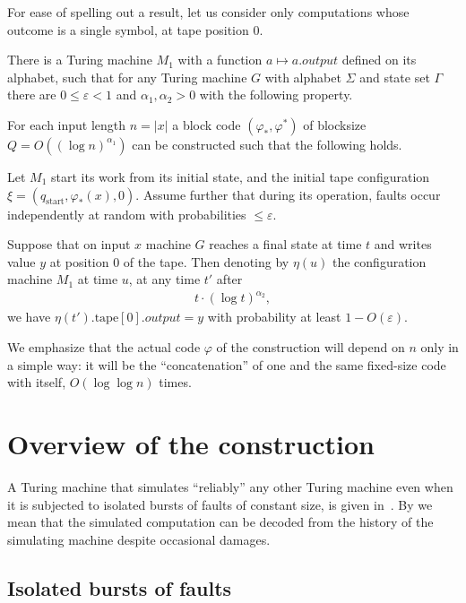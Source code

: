 \documentclass[12pt]{memoir}
\newcommand{\Output}{\mathit{output}}
\newcommand{\start}{\mathrm{start}}
\newcommand{\tape}{\mathrm{tape}}
\begin{document}
For ease of spelling out a result, let us consider only computations whose outcome
is a single symbol, at tape position 0.

\begin{theorem}\label{thm:main-main}
There is a Turing machine \( M_{1} \) with a 
function \( a\mapsto a.\Output \) defined on its alphabet, 
such that
for any Turing machine \( G \) with alphabet \( \Sigma \) and state set \( \Gamma \)
there are \( 0\le\varepsilon <1 \) and \( \alpha_{1},\alpha_{2}>0 \) 
with the following property.

For each input length \( n=|x| \) a block code
\( (\varphi_*, \varphi^*) \) of blocksize \( Q=O((\log n)^{\alpha_{1}}) \) can be constructed 
such that the following holds.

Let \( M_1 \) start its work from its initial state,
and the initial tape configuration \( \xi=(q_{\start},\varphi_{*}(x),0) \).
Assume further that
during its operation, faults occur independently at random
with probabilities \( \le \varepsilon \).

Suppose that on input \( x \) machine \( G \) reaches a final state at time \( t \) and writes
value \( y \) at position 0 of the tape.
Then denoting by \( \eta(u) \) the configuration machine \( M_{1} \) at time \( u \),
at any time \( t' \) after
 \begin{align*}
   t\cdot (\log t)^{\alpha_{2}},
 \end{align*}
we have \( \eta(t').\tape[0].\Output= y \)
with probability at least \( 1 - O(\varepsilon) \).
\end{theorem}

We emphasize that the actual
code \( \varphi \) of the construction will depend on \( n \) only in a simple way:
it will be the ``concatenation'' of one and the same fixed-size
code with itself, \( O(\log\log n) \) times.


\section{Overview of the construction}

A Turing machine that simulates ``reliably'' any other
Turing machine even when it is subjected to isolated bursts of faults of constant size,
is given in~\cite{burstyTuring12Conf}.
By  we mean that the 
simulated computation can be decoded from the history
of the simulating machine despite occasional damages.


\subsection{Isolated bursts of faults}\label{sec:bursts}
\end{document}
